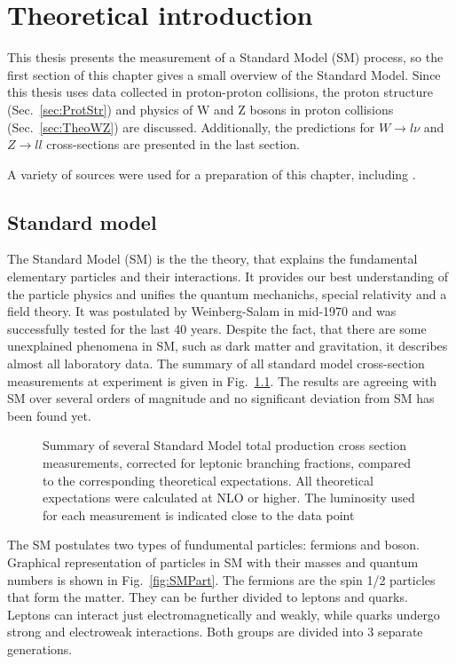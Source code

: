 \chapter{Theoretical introduction}
\minitoc
This thesis presents the measurement of a Standard Model (SM) process, so the first section of this chapter gives a small overview of the Standard Model. Since this thesis uses data collected in proton-proton collisions, the proton structure (Sec.~\ref{sec:ProtStr}) and physics of W and Z bosons in proton collisions (Sec.~\ref{sec:TheoWZ}) are discussed. Additionally, the predictions for $W\to l\nu$ and $Z \to ll$ cross-sections are presented in the last section.

A variety of sources were used for a preparation of this chapter, including \cite{QPrim, Okun}.
\section{Standard model}

The Standard Model (SM) is the the theory, that explains the fundamental elementary particles and their interactions. It provides our best understanding of the particle physics and unifies the quantum mechanichs, special relativity and a field theory. It was postulated by Weinberg-Salam in mid-1970\cite{SM1, SM2, SM3} and was successfully tested for the last 40 years. Despite the fact, that there are some unexplained phenomena in SM, such as dark matter and gravitation, it describes almost all laboratory data. The summary of all standard model cross-section measurements at \atlas experiment is given in Fig.~\ref{fig:SMxsec}. The results are agreeing with SM over several orders of magnitude and no significant deviation from SM has been found yet.

\begin{figure}[!tpb]
\caption{Summary of several Standard Model total production cross section measurements, corrected for leptonic branching fractions, compared to the corresponding theoretical expectations. All theoretical expectations were calculated at NLO or higher. The luminosity used for each measurement is indicated close to the data point \cite{SMPubRes}}
\label{fig:SMxsec}
\end{figure}

The SM postulates two types of fundumental particles: fermions and boson. Graphical representation of particles in SM with their masses and quantum numbers is shown in Fig.~\ref{fig:SMPart}. The fermions are the spin 1/2 particles that form the matter. They can be further divided to leptons and quarks. Leptons can interact just electromagnetically and weakly, while quarks undergo strong and electroweak interactions. Both groups are divided into 3 separate generations.

